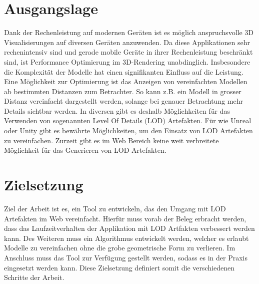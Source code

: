 \section{Ausgangslage}
Dank der Rechenleistung auf modernen Geräten ist es möglich anspruchsvolle 3D Visualisierungen auf diversen Geräten anzuwenden. Da diese Applikationen sehr rechenintensiv sind und gerade mobile Geräte in ihrer Rechenleistung beschränkt sind, ist Performance Optimierung im 3D-Rendering unabdinglich. Insbesondere die Komplexität der Modelle hat einen signifikanten Einfluss auf die Leistung.
Eine Möglichkeit zur Optimierung ist das Anzeigen von vereinfachten Modellen ab bestimmten Distanzen zum Betrachter. So kann z.B. ein Modell in grosser Distanz vereinfacht dargestellt werden, solange bei genauer Betrachtung mehr Details sichtbar werden.
In diversen  gibt es deshalb Möglichkeiten für das Verwenden von sogenannten Level Of Details (LOD) Artefakten.
Für  wie Unreal oder Unity gibt es bewährte Möglichkeiten, um den Einsatz von LOD Artefakten zu vereinfachen. Zurzeit gibt es im Web Bereich keine weit verbreitete Möglichkeit für das Generieren von LOD Artefakten.

\section{Zielsetzung}
Ziel der Arbeit ist es, ein Tool zu entwickeln, das den Umgang mit LOD Artefakten im Web vereinfacht. Hierfür muss vorab der Beleg erbracht werden, dass das Laufzeitverhalten der Applikation mit LOD Artfakten verbessert werden kann. Des Weiteren muss ein Algorithmus entwickelt werden, welcher es erlaubt Modelle zu vereinfachen ohne die grobe geometrische Form zu verlieren. Im Anschluss muss das Tool zur Verfügung gestellt werden, sodass es in der Praxis eingesetzt werden kann. Diese Zielsetzung definiert somit die verschiedenen Schritte der Arbeit.

